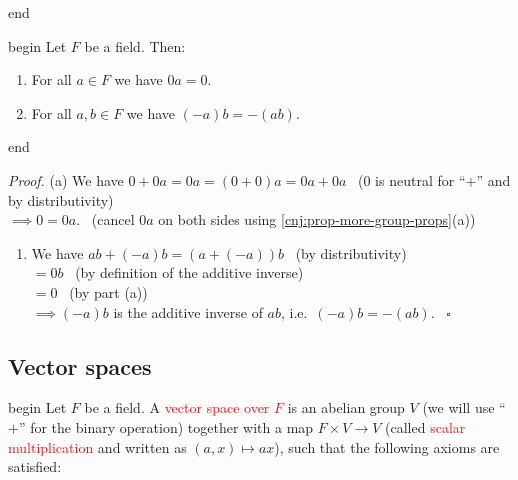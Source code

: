 \documentclass[
  12pt,
  a4paper,
  twoside]{article}
\providecommand{\tightlist}{%
  \setlength{\itemsep}{0pt}\setlength{\parskip}{0pt}}
\theoremstyle{plain}
\theoremstyle{definition}
\begin{document}
\csname end

\csname begin\label{cnj:prop-fieldprops}
Let \(F\) be a field. Then:

\begin{enumerate}
\def\labelenumi{(\alph{enumi})}
\tightlist
\item
  For all \(a\in F\) we have \(0a = 0\).
\item
  For all \(a,b\in F\) we have \((-a)b = -(ab)\).
\end{enumerate}

\csname end

\emph{Proof.}
(a) We have \(0 + 0a = 0a = (0 + 0)a = 0a + 0a\) \hfill~{(\(0\) is neutral for ``\(+\)'' and by distributivity)}\\
\hspace*{0.333em}\hspace*{0.333em}\hspace*{0.333em}\(\implies 0 = 0a\). \hfill~{(cancel \(0a\) on both sides using \ref{cnj:prop-more-group-props}(a))}

\begin{enumerate}
\def\labelenumi{(\alph{enumi})}
\setcounter{enumi}{1}
\tightlist
\item
  We have \(ab + (-a)b = (a + (-a))b\) \hfill~{(by distributivity)}\\
  \hspace*{0.333em}\hspace*{0.333em}\hspace*{0.333em}\hspace*{0.333em}\(= 0b\) \hfill~{(by definition of the additive inverse)}\\
  \hspace*{0.333em}\hspace*{0.333em}\hspace*{0.333em}\hspace*{0.333em}\(= 0\) \hfill~{(by part (a))}\\
  \(\implies (-a)b\) is the additive inverse of \(ab\), i.e.~\((-a)b = -(ab)\).
  \hfill~{\(\square\)}
\end{enumerate}

\hypertarget{ss-vector-spaces}{%
\subsection{Vector spaces}\label{ss-vector-spaces}}

\csname begin\label{cnj:defn-vectorspace}
Let \(F\) be a field. A \textcolor{red}{vector space over $F$} is an abelian group \(V\) (we will use ``\(+\)'' for the binary operation) together with a map \(F \times V \to V\) (called \textcolor{red}{scalar multiplication} and written as \((a,x) \mapsto ax\)), such that the following axioms are satisfied:
\end{document}
